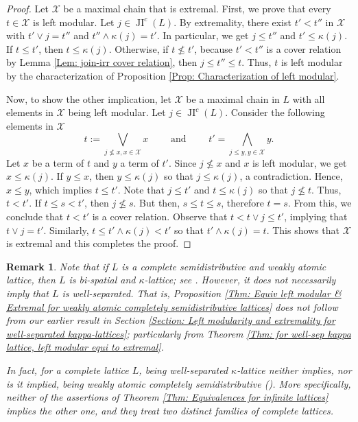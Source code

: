 \documentclass{amsart}
\theoremstyle{thmstyle}
\theoremstyle{exstyle}
\theoremstyle{defstyle}
\theoremstyle{remstyle}
\newtheorem{remark}[thm]{Remark}
\theoremstyle{remstyle}
\DeclareMathOperator*{\JI}{JI}
\begin{document}
\begin{proof}
    Let $\mathcal{X}$ be a maximal chain that is extremal. First, we prove that every $t \in \mathcal{\mathcal{X}}$ is left modular. Let $j \in \JI^c(L)$. By extremality, there exist $t' < t''$ in $\mathcal{X}$ with $t' \vee j = t''$ and $t'' \wedge \kappa(j) = t'$. In particular, we get $j \le t''$ and $ t' \le \kappa(j)$. If $t \le t'$, then $t \le \kappa(j)$. Otherwise, if $t \not\le t'$, because $t' < t''$ is a cover relation by Lemma \ref{Lem: join-irr cover relation}, then $j \leq t'' \leq t$. Thus, $t$ is left modular by the characterization of Proposition \ref{Prop: Characterization of left modular}.

Now, to show the other implication, let $\mathcal{X}$ be a maximal chain in $L$ with all elements in $\mathcal{X}$ being left modular. Let $j \in \JI^c(L)$. Consider the following elements in $\mathcal{X}$
$$t:= \bigvee_{j \not \le x, x \in \mathcal{X}} x \qquad \text{ and } \qquad t' = \bigwedge_{j \le y, y \in \mathcal{X}} y.$$
Let $x$ be a term of $t$ and $y$ a term of $t'$. Since $j \not \le x$ and $x$ is left modular, we get $x \le \kappa(j)$. If $y \le x$, then $y \le \kappa(j)$ so that $j \le \kappa(j)$, a contradiction. Hence, $x \le y$, which implies $t \le t'$. 
Note that $j \le t'$ and $t \le \kappa(j)$ so that $j \not \le t$. Thus, $t < t'$. If $t \le s < t'$, then $j \not \le s$. But then, $s \le t \le s$, therefore $t = s$. From this, we conclude that $t < t'$ is a cover relation. Observe that $t < t \vee j \le t'$, implying that $t \vee j = t'$. Similarly, $t \le t' \wedge \kappa(j) < t'$ so that $t' \wedge \kappa(j)=t$. This shows that $\mathcal{X}$ is extremal and this completes the proof.
\end{proof}


\begin{remark}\label{Rem: comparison between our two implications}
   Note that if $L$ is a complete semidistributive and weakly atomic lattice, then $L$ is bi-spatial and $\kappa$-lattice; see \cite[Theorem 3.1]{RST}. However, it does not necessarily imply that $L$ is  well-separated. That is, Proposition \ref{Thm: Equiv left modular & Extremal for weakly atomic completely semidistributive lattices} does not follow from our earlier result in Section \ref{Section: Left modularity and extremality for well-separated kappa-lattices}; particularly from Theorem \ref{Thm: for well-sep kappa lattice, left modular equi to extremal}. 
   
   In fact, for a complete lattice $L$, being well-separated $\kappa$-lattice neither implies, nor is it implied, being weakly atomic completely semidistributive (\cite[Examples 3.22 \& 3.25]{RST}). More specifically, neither of the assertions of Theorem \ref{Thm: Equivalences for infinite lattices} implies the other one, and they treat two distinct families of complete lattices.
\end{remark}
\end{document}
